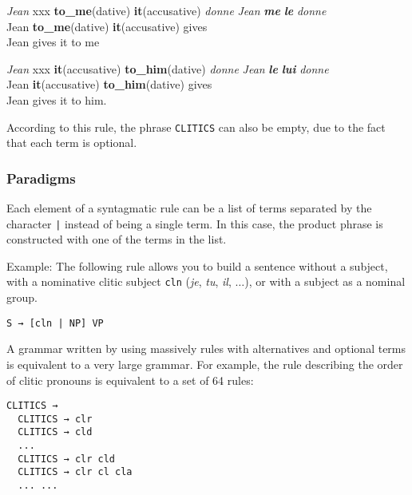 \documentclass[11pt]{article}
\begin{document}
\begin{exe}
\ex \begin{xlist} 
\ex 
\begin{tabbing}
\textit{Jean} xxx \= \textbf{to\_me}(dative) \= \textbf{it}(accusative) \= \textit{donne}\kill
\textit{Jean} \>\textit{\textbf{me}} \>\textit{\textbf{le}} \>\textit{donne}\\
Jean \> \textbf{to\_me}(dative) \> \textbf{it}(accusative) \> gives\\
Jean gives it to me\\
\end{tabbing}

\ex 
\begin{tabbing}
\textit{Jean} xxx \=\textbf{it}(accusative) \=\textbf{to\_him}(dative) \= \textit{donne}\kill
\textit{Jean} \>\textit{\textbf{le}} \>\textit{\textbf{lui}} \>\textit{donne}\\
Jean \>\textbf{it}(accusative) \>\textbf{to\_him}(dative) \>gives\\
Jean gives it to him.
\end{tabbing}
\end{xlist}
\end{exe}
 
According to this rule, the phrase \texttt{CLITICS} can also be empty,
due to the fact that each term is optional.

\subsubsection*{Paradigms}

Each element of a syntagmatic rule can be a list of terms
separated by the character \verb#|# instead of being a single term. In this
case, the product phrase is constructed with one of the terms in the list.

Example:
The following rule allows you to build a sentence without a subject, with a
nominative clitic subject \texttt{cln} (\textit{je}, \textit{tu},
\textit{il}, $\dots$), or with a subject as a nominal group.

\begin{lstlisting}[numbers=none]
S → [cln | NP] VP
\end{lstlisting}

A grammar written by using massively rules with alternatives and
optional terms is equivalent to a very large grammar.  For example,
the rule describing the order of clitic pronouns is equivalent to a
set of 64 rules:
 
\begin{lstlisting}[numbers=none]
  CLITICS → 
  CLITICS → clr 
  CLITICS → cld 
  ...
  CLITICS → clr cld 
  CLITICS → clr cl cla
  ... ...
\end{lstlisting}
\end{document}
